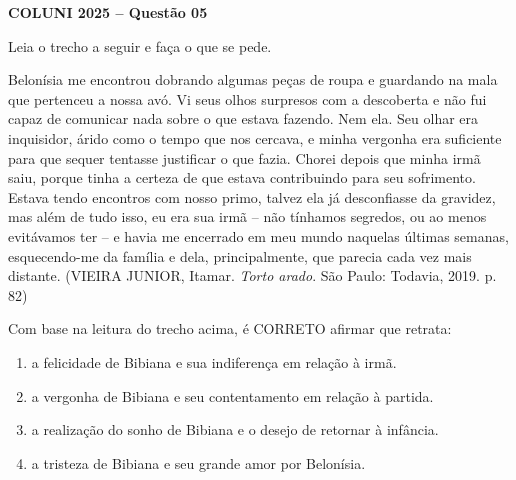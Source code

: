 \textbf{COLUNI 2025 -- Questão 05}\par\medskip Leia o trecho a seguir e faça o que se pede.

\par

Belonísia me encontrou dobrando algumas peças de roupa e guardando na mala que pertenceu a nossa avó. Vi seus olhos surpresos com a descoberta e não fui capaz de comunicar nada sobre o que estava fazendo. Nem ela. Seu olhar era inquisidor, árido como o tempo que nos cercava, e minha vergonha era suficiente para que sequer tentasse justificar o que fazia. Chorei depois que minha irmã saiu, porque tinha a certeza de que estava contribuindo para seu sofrimento. Estava tendo encontros com nosso primo, talvez ela já desconfiasse da gravidez, mas além de tudo isso, eu era sua irmã – não tínhamos segredos, ou ao menos evitávamos ter – e havia me encerrado em meu mundo naquelas últimas semanas, esquecendo-me da família e dela, principalmente, que parecia cada vez mais distante. (VIEIRA JUNIOR, Itamar. \textit{Torto arado}. São Paulo: Todavia, 2019. p. 82)

\par

Com base na leitura do trecho acima, é CORRETO afirmar que retrata:\begin{enumerate}
\item a felicidade de Bibiana e sua indiferença em relação à irmã.
\item a vergonha de Bibiana e seu contentamento em relação à partida.
\item a realização do sonho de Bibiana e o desejo de retornar à infância.
\item a tristeza de Bibiana e seu grande amor por Belonísia.\end{enumerate}
